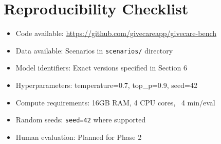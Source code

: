 \documentclass{article}%
\begin{document}
\section{Reproducibility Checklist}

\begin{itemize}
    \item[\checkmark] Code available: \url{https://github.com/givecareapp/givecare-bench}
    \item[\checkmark] Data available: Scenarios in \texttt{scenarios/} directory
    \item[\checkmark] Model identifiers: Exact versions specified in Section 6
    \item[\checkmark] Hyperparameters: temperature=0.7, top\_p=0.9, seed=42
    \item[\checkmark] Compute requirements: 16GB RAM, 4 CPU cores, ~4 min/eval
    \item[\checkmark] Random seeds: \texttt{seed=42} where supported
    \item[~~] Human evaluation: Planned for Phase 2
\end{itemize}
%
\end{document}

